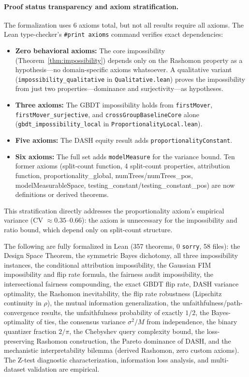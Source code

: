 \documentclass{article}
\begin{document}
\paragraph{Proof status transparency and axiom stratification.}
\begin{sloppypar}
The formalization uses 6 axioms total,
but not all results require all axioms. The Lean type-checker's
\texttt{\#print axioms} command verifies exact dependencies:
\begin{itemize}
\item \textbf{Zero behavioral axioms:} The core impossibility
(Theorem~\ref{thm:impossibility}) depends only on the Rashomon property as a
hypothesis---no domain-specific axioms whatsoever. A qualitative variant
(\texttt{impossibility\allowbreak\_qualitative} in \texttt{Qualitative.lean}) proves
the impossibility from just two properties---dominance and surjectivity---as
hypotheses.
\item \textbf{Three axioms:} The GBDT impossibility holds from \texttt{firstMover}, \texttt{firstMover\_surjective}, and \texttt{crossGroupBaselineCore} alone (\texttt{gbdt\allowbreak\_impossibility\allowbreak\_local} in \texttt{Proportionality\allowbreak Local.lean}).
\item \textbf{Five axioms:} The DASH equity result adds \texttt{proportionalityConstant}.
\item \textbf{Six axioms:} The full set adds \texttt{modelMeasure} for the variance bound. Ten former axioms (split-count function, 4 split-count properties, attribution function, proportionality\_global, numTrees/numTrees\_pos, modelMeasurableSpace, testing\_constant/testing\_constant\_pos) are now definitions or derived theorems.
\end{itemize}
\end{sloppypar}
This stratification directly addresses the proportionality axiom's empirical variance (CV $\approx 0.35$--$0.66$): the axiom is unnecessary for the impossibility and ratio bound, which depend only on split-count structure.

The following are fully formalized in Lean (357 theorems, 0 \texttt{sorry}, 58 files): the Design Space Theorem, the symmetric Bayes dichotomy, all three impossibility instances, the conditional attribution impossibility, the Gaussian FIM impossibility and flip rate formula, the fairness audit impossibility, the intersectional fairness compounding, the exact GBDT flip rate, DASH variance optimality, the Rashomon inevitability, the flip rate robustness (Lipschitz continuity in $\rho$), the mutual information generalization, the unfaithfulness/path-convergence results, the unfaithfulness probability of exactly $1/2$, the Bayes-optimality of ties, the consensus variance $\sigma^2/M$ from independence, the binary quantizer fraction $2/\pi$, the Chebyshev query complexity bound, the loss-preserving Rashomon construction, the Pareto dominance of DASH, and the mechanistic interpretability bilemma (derived Rashomon, zero custom axioms). The Z-test diagnostic characterization, information loss analysis, and multi-dataset validation are empirical.
\end{document}
